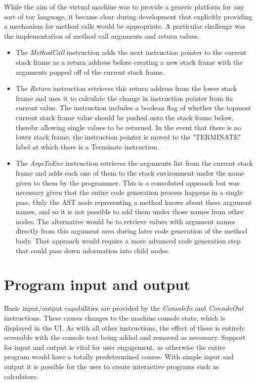 While the aim of the virtual machine was to provide a generic platform for any sort of toy language, it became clear during development that explicitly providing a mechanism for method calls would be appropriate. A particular challenge was the implementation of method call arguments and return values.

\begin{itemize}
\item The \textit{MethodCall} instruction adds the next instruction pointer to the current stack frame as a return address before creating a new stack frame with the arguments popped off of the current stack frame.
\item The \textit{Return} instruction retrieves this return address from the lower stack frame and uses it to calculate the change in instruction pointer from its current value. The instruction includes a boolean flag of whether the topmost current stack frame value should be pushed onto the stack frame below, thereby allowing single values to be returned. In the event that there is no lower stack frame, the instruction pointer is moved to the "TERMINATE" label at which there is a Terminate instruction.
\item The \textit{ArgsToEnv} instruction retrieves the arguments list from the current stack frame and adds each one of them to the stack environment under the name given to them by the programmer. This is a convoluted approach but was necessary given that the entire code generation process happens in a single pass. Only the AST node representing a method knows about these argument names, and so it is not possible to add them under those names from other nodes. The alternative would be to retrieve values with argument names directly from this argument area during later code generation of the method body. That approach would require a more advanced code generation step that could pass down information into child nodes.
\end{itemize}

\section{Program input and output}

Basic input/output capabilities are provided by the \textit{ConsoleIn} and \textit{ConsoleOut} instructions. These causes changes to the machine console state, which is displayed in the UI. As with all other instructions, the effect of these is entirely reversible with the console text being added and removed as necessary. Support for input and output is vital for user engagement, as otherwise the entire program would have a totally predetermined course. With simple input and output it is possible for the user to create interactive programs such as calculators.

